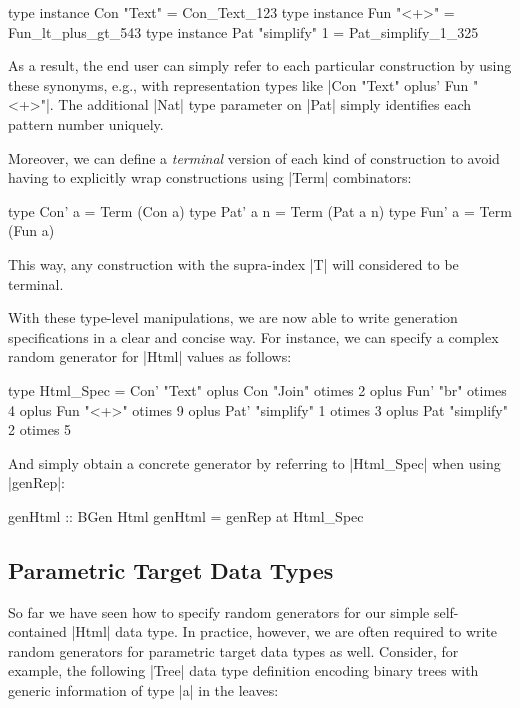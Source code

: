 \begin{code}
type instance Con "Text"        = Con_Text_123
type instance Fun "<+>"         = Fun_lt_plus_gt_543
type instance Pat "simplify" 1  = Pat_simplify_1_325
\end{code}
%
As a result, the end user can simply refer to each particular construction by
using these synonyms, e.g., with representation types like |Con "Text" oplus'
Fun "<+>"|.
%
The additional |Nat| type parameter on |Pat| simply identifies each pattern
number uniquely.


Moreover, we can define a \emph{terminal} version of each kind of construction
to avoid having to explicitly wrap constructions using |Term| combinators:

\begin{code}
type Con' a    = Term  (Con a)
type Pat' a n  = Term  (Pat a n)
type Fun' a    = Term  (Fun a)
\end{code}
%
This way, any construction with the supra-index |T| will considered to be
terminal.


With these type-level manipulations, we are now able to write generation
specifications in a clear and concise way.
%
For instance, we can specify a complex random generator for |Html| values as
follows:

\begin{code}
type Html_Spec  =      Con'  "Text"
                oplus  Con   "Join"         otimes 2
                oplus  Fun'  "br"           otimes 4
                oplus  Fun   "<+>"          otimes 9
                oplus  Pat'  "simplify"  1  otimes 3
                oplus  Pat   "simplify"  2  otimes 5
\end{code}
%
And simply obtain a concrete generator by referring to |Html_Spec| when using
|genRep|:

\begin{code}
genHtml :: BGen Html
genHtml = genRep at Html_Spec
\end{code}


%
\subsection{Parametric Target Data Types }

So far we have seen how to specify random generators for our simple
self-contained |Html| data type.
%
In practice, however, we are often required to write random generators for
parametric target data types as well.
%
Consider, for example, the following |Tree| data type definition encoding binary
trees with generic information of type |a| in the leaves:

